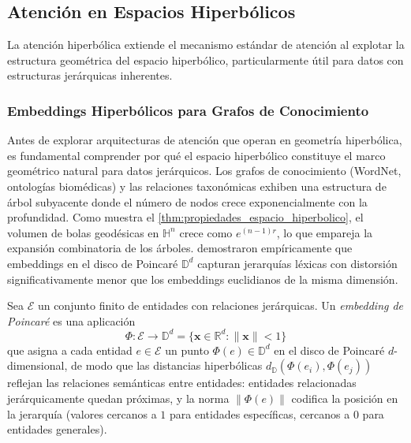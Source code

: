 \subsection{Atención en Espacios Hiperbólicos}

La atención hiperbólica extiende el mecanismo estándar de atención al explotar la estructura geométrica del espacio hiperbólico, particularmente útil para datos con estructuras jerárquicas inherentes.

\subsubsection{Embeddings Hiperbólicos para Grafos de Conocimiento}
\label{subsubsec:embeddings_hiperbolicos_grafos}

Antes de explorar arquitecturas de atención que operan en geometría hiperbólica, es fundamental comprender por qué el espacio hiperbólico constituye el marco geométrico natural para datos jerárquicos. Los grafos de conocimiento (WordNet, ontologías biomédicas) y las relaciones taxonómicas exhiben una estructura de árbol subyacente donde el número de nodos crece exponencialmente con la profundidad. Como muestra el \autoref{thm:propiedades_espacio_hiperbolico}, el volumen de bolas geodésicas en $\mathbb{H}^n$ crece como $e^{(n-1)r}$, lo que empareja la expansión combinatoria de los árboles. \citet{nickel2017poincare} demostraron empíricamente que embeddings en el disco de Poincaré $\mathbb{D}^d$ capturan jerarquías léxicas con distorsión significativamente menor que los embeddings euclidianos de la misma dimensión.

\begin{definition}\label{def:embedding_poincare}
Sea $\mathcal{E}$ un conjunto finito de entidades con relaciones jerárquicas. Un \textit{embedding de Poincaré} es una aplicación
\begin{equation}
    \Phi: \mathcal{E} \to \mathbb{D}^d = \{\mathbf{x} \in \mathbb{R}^d : \|\mathbf{x}\| < 1\}
\end{equation}
que asigna a cada entidad $e \in \mathcal{E}$ un punto $\Phi(e) \in \mathbb{D}^d$ en el disco de Poincaré $d$-dimensional, de modo que las distancias hiperbólicas $d_{\mathbb{D}}(\Phi(e_i), \Phi(e_j))$ reflejan las relaciones semánticas entre entidades: entidades relacionadas jerárquicamente quedan próximas, y la norma $\|\Phi(e)\|$ codifica la posición en la jerarquía (valores cercanos a $1$ para entidades específicas, cercanos a $0$ para entidades generales).
\end{definition}

